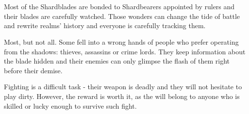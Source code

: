 \section{\enemyRogueShardbearerName}
\label{enemyRogueShardbearer}

Most of the Shardblades are bonded to Shardbearers appointed by rulers and their blades are carefully watched. Those wonders can change the tide of battle and rewrite realms' history and everyone is carefully tracking them.

Most, but not all. Some fell into a wrong hands of people who prefer operating from the shadows: thieves, assassins or crime lords. They keep information about the blade hidden and their enemies can only glimpse the flash of them right before their demise.

Fighting \enemyRogueShardbearer{} is a difficult task - their weapon is deadly and they will not hesitate to play dirty. However, the reward is worth it, as the \lootRogueShardblade{} will belong to anyone who is skilled or lucky enough to survive such fight.
\\


\vspace{1cm}

